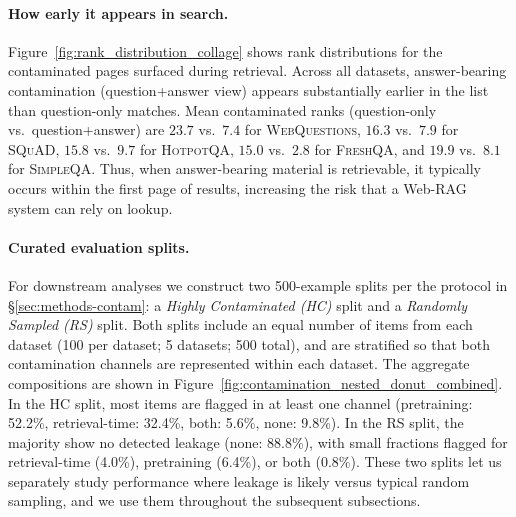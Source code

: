 \paragraph{How early it appears in search.}
Figure~\ref{fig:rank_distribution_collage} shows rank distributions for the contaminated pages surfaced during retrieval. Across all datasets, answer-bearing contamination (question+answer view) appears substantially earlier in the list than question-only matches. Mean contaminated ranks (question-only vs.\ question+answer) are $23.7$ vs.\ $7.4$ for \textsc{WebQuestions}, $16.3$ vs.\ $7.9$ for \textsc{SQuAD}, $15.8$ vs.\ $9.7$ for \textsc{HotpotQA}, $15.0$ vs.\ $2.8$ for \textsc{FreshQA}, and $19.9$ vs.\ $8.1$ for \textsc{SimpleQA}. Thus, when answer-bearing material is retrievable, it typically occurs within the first page of results, increasing the risk that a Web-RAG system can rely on lookup.

\paragraph{Curated evaluation splits.}
For downstream analyses we construct two 500-example splits per the protocol in \S\ref{sec:methods-contam}: a \emph{Highly Contaminated (HC)} split and a \emph{Randomly Sampled (RS)} split. Both splits include an equal number of items from each dataset (100 per dataset; 5 datasets; 500 total), and are stratified so that both contamination channels are represented within each dataset. The aggregate compositions are shown in Figure~\ref{fig:contamination_nested_donut_combined}. In the HC split, most items are flagged in at least one channel (pretraining: 52.2\%, retrieval-time: 32.4\%, both: 5.6\%, none: 9.8\%). In the RS split, the majority show no detected leakage (none: 88.8\%), with small fractions flagged for retrieval-time (4.0\%), pretraining (6.4\%), or both (0.8\%). These two splits let us separately study performance where leakage is likely versus typical random sampling, and we use them throughout the subsequent subsections.




